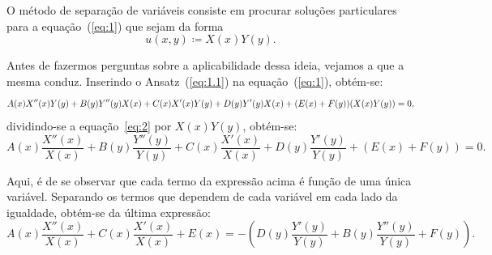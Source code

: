 \documentclass[10pt,a4paper]{article}
\begin{document}
	O método de separação de variáveis consiste em procurar soluções particulares para a equação~(\ref{eq:1}) que sejam da forma
	\begin{equation}
		u(x,y)\coloneqq X(x)Y(y).
		\label{eq:1.1}
	\end{equation}
	
	Antes de fazermos perguntas sobre a aplicabilidade dessa ideia, vejamos a que a mesma conduz. Inserindo o Ansatz~(\ref{eq:1.1}) na equação~(\ref{eq:1}), obtém-se:
	\begin{equation}
		\small
		A(x)X''(x)Y(y) + B(y)Y''(y)X(x) + C(x)X'(x)Y(y) + D(y)Y'(y)X(x) + (E(x)+F(y))(X(x)Y(y)) = 0,
		\label{eq:2}
	\end{equation}
	dividindo-se a equação~\ref{eq:2} por $X(x)Y(y)$, obtém-se:
		\begin{equation}
		A(x)\frac{X''(x)}{X(x)} + B(y)\frac{Y''(y)}{Y(y)} + C(x)\frac{X'(x)}{X(x)} + D(y)\frac{Y'(y)}{Y(y)} + (E(x)+F(y)) = 0.
		\label{eq:3}
	\end{equation}
	
	Aqui, é de se observar que cada termo da expressão acima é função de uma única variável. Separando os termos que dependem de cada variável em cada lado da igualdade, obtém-se da última expressão:
	\begin{equation}
		A(x)\frac{X''(x)}{X(x)} + C(x)\frac{X'(x)}{X(x)} + E(x) = -\left(D(y)\frac{Y'(y)}{Y(y)} + B(y)\frac{Y''(y)}{Y(y)} + F(y)\right).
		\label{eq:4}
	\end{equation}
	
\end{document}

